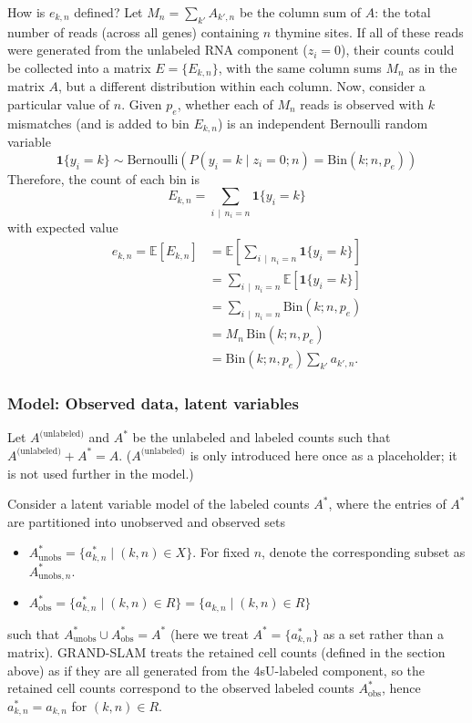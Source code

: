 \documentclass[11pt]{article}
\begin{document}
How is $e_{k,n}$ defined? Let $M_n = \sum_{k'} A_{k',n}$ be the column sum of $A$: the total number of reads (across all genes) containing $n$ thymine sites. If all of these reads were generated from the unlabeled RNA component ($z_i = 0$), their counts could be collected into a matrix $E = \{E_{k,n}\}$, with the same column sums $M_n$ as in the matrix $A$, but a different distribution within each column. Now, consider a particular value of $n$. Given $p_e$, whether each of $M_n$ reads is observed with $k$ mismatches (and is added to bin $E_{k,n}$) is an independent Bernoulli random variable
$$
\mathbf{1}\{y_i = k\} \sim \mathrm{Bernoulli}(P(y_i = k \mid z_i = 0; n) = \mathrm{Bin}(k; n, p_e))
$$
Therefore, the count of each bin is
$$
E_{k,n} = \sum_{i \, \mid \, n_i = n} \mathbf{1}\{y_i = k\}
$$
with expected value
\[
\begin{aligned}
e_{k,n} = \mathbb{E}[E_{k,n}]
&= \mathbb{E}\left[\sum_{i \, \mid \, n_i = n} \mathbf{1}\{y_i = k\} \right] \\
&= \sum_{i \, \mid \, n_i = n} \mathbb{E}[\mathbf{1}\{y_i = k\}] \\
&= \sum_{i \, \mid \, n_i = n} \mathrm{Bin}(k; n, p_e) \\
&= M_n\,\mathrm{Bin}(k;n,p_e) \\
&= \mathrm{Bin}(k;n,p_e)\sum_{k'} a_{k',n}.
\end{aligned}
\]

\subsubsection{Model: Observed data, latent variables}

Let $A^\text{(unlabeled)}$ and $A^*$ be the unlabeled and labeled counts such that $A^\text{(unlabeled)} + A^* = A$. ($A^\text{(unlabeled)}$ is only introduced here once as a placeholder; it is not used further in the model.)

Consider a latent variable model of the labeled counts $A^*$, where the entries of $A^*$ are partitioned into unobserved and observed sets
\begin{itemize}
    \item $A_\text{unobs}^* = \{a^*_{k,n} \mid (k, n) \in X \}$. For fixed $n$, denote the corresponding subset as $A^*_{\mathrm{unobs},n}$.
    \item $A_\text{obs}^* = \{a^*_{k,n} \mid (k, n) \in R \} = \{ a_{k,n} \mid (k, n) \in R \}$
\end{itemize}
such that $A_\text{unobs}^* \cup A_\text{obs}^* = A^*$ (here we treat $A^* = \{ a_{k,n}^* \}$ as a set rather than a matrix). GRAND-SLAM treats the retained cell counts (defined in the section above) as if they are all generated from the 4sU-labeled component, so the retained cell counts correspond to the observed labeled counts $A_\text{obs}^*$, hence $a^*_{k,n} = a_{k, n}$ for $(k, n) \in R$.
\end{document}
